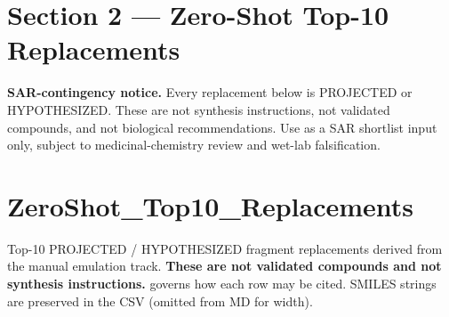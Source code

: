 \documentclass[11pt,a4paper]{article}
\begin{document}
\hypertarget{section-2--zero-shot-top-10-replacements}{%
\section{Section 2 --- Zero-Shot Top-10
Replacements}\label{section-2--zero-shot-top-10-replacements}}

\textbf{SAR-contingency notice.} Every replacement below is PROJECTED or HYPOTHESIZED. These are not
synthesis instructions, not validated compounds, and not biological recommendations. Use as a SAR
shortlist input only, subject to medicinal-chemistry review and wet-lab falsification.

\hypertarget{zeroshot_top10_replacements}{%
\section{ZeroShot\_Top10\_Replacements}\label{zeroshot_top10_replacements}}

Top-10 PROJECTED / HYPOTHESIZED fragment replacements derived from the manual emulation track.
\textbf{These are not validated compounds and not synthesis instructions.}
\texttt{} governs how each row may be cited. SMILES
strings are preserved in the CSV (omitted from MD for width).
\end{document}
